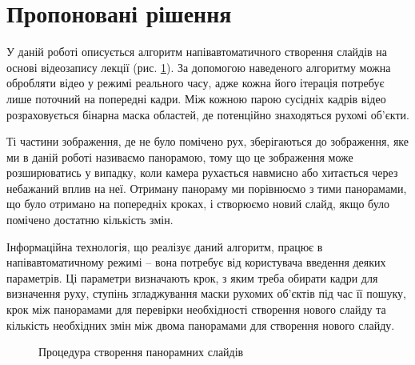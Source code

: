 \section{Пропоновані рішення}


У даній роботі описується алгоритм напівавтоматичного 
створення слайдів на основі відеозапису лекції (рис. \ref{fig:pipeline}).
За допомогою наведеного алгоритму можна обробляти відео 
у режимі реального часу, адже кожна його ітерація потребує 
лише поточний на попередні кадри. Між кожною парою 
сусідніх кадрів відео розраховується бінарна маска областей, де 
потенційно знаходяться рухомі об’єкти. 


Ті частини зображення, де не було помічено рух, зберігаються до 
зображення, яке ми в даній роботі називаємо панорамою, тому що 
це зображення може розширюватись у випадку, коли камера рухається 
навмисно або хитається через небажаний вплив на неї. 
Отриману панораму ми порівнюємо з тими панорамами, що було отримано на 
попередніх кроках, і створюємо новий слайд, якщо було помічено 
достатню кількість змін.


Інформаційна технологія, що реалізує даний алгоритм, працює в 
напівавтоматичному режимі – вона потребує від користувача введення 
деяких параметрів. 
Ці параметри визначають крок, з яким треба обирати кадри для визначення руху, 
ступінь згладжування маски рухомих об’єктів під час її пошуку, крок 
між панорамами для перевірки необхідності створення нового 
слайду та кількість необхідних змін між двома панорамами для створення нового слайду.



\usetikzlibrary{arrows,positioning,shapes}
\begin{figure}
\begin{center}
\end{center}
\caption{Процедура створення панорамних слайдів
\label{fig:pipeline}
}
\end{figure}

\clearpage